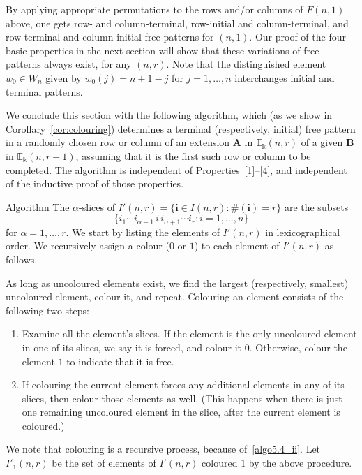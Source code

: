 \documentclass[ALCO,ThmDefs,Unicode,epreuves]{cedram}
\newcommand{\E}{\mathbb{E}}
\newcommand{\bi}{{\boldsymbol{i}}} %
\newcommand{\bA}{\mathbf{A}}
\newcommand{\bB}{\mathbf{B}}
\newenvironment{algorithm}{\begin{enonce}{Algorithm}}{\end{enonce}} %
\begin{document}
By applying appropriate permutations to the rows and/or columns of
$F(n,1)$ above, one gets row- and column-terminal, row-initial and
column-terminal, and row-terminal and column-initial free patterns for
$(n,1)$. Our proof of the four basic properties in the next section
will show that these variations of free patterns always exist, for any
$(n,r)$. Note that the distinguished element $w_0 \in W_n$ given by
$w_0(j) = n+1-j$ for $j = 1, \dots, n$ interchanges initial and
terminal patterns.


We conclude this section with the following algorithm, which (as we
show in Corollary~\ref{cor:colouring}) determines a terminal
(respectively, initial) free pattern in a randomly chosen row or
column of an extension $\bA$ in $\E_\Bbbk(n,r)$ of a given $\bB$ in
$\E_\Bbbk(n,r-1)$, assuming that it is the first such row or column to
be completed. The algorithm is independent of
Properties~\ref{1}--\ref{4}, and independent of the inductive proof of
those properties.

\begin{algorithm}\label{algo}
The $\alpha$-slices of $I'(n,r)=\{\bi \in I(n,r): \#(\bi)=r\}$ are the
subsets
\[
\{i_1 \cdots i_{\alpha-1}\, i\, i_{\alpha+1}\cdots i_r: i = 1, \dots,
n\}
\]
for $\alpha = 1, \dots, r$. We start by listing the elements of
$I'(n,r)$ in lexicographical order. We recursively assign a colour
\textup{(}$0$ or $1$\textup{)} to each element of $I'(n,r)$ as follows.

As long as uncoloured elements exist, we find the largest
\textup{(}respectively, smallest\textup{)} uncoloured element, colour
it, and repeat. Colouring an element consists of the following two
steps:
\begin{enumerate}[label=(\alph*)]
\item\label{algo5.4_i} Examine all the element's slices. If the element is the only
 uncoloured element in one of its slices, we say it is forced, and
 colour it $0$. Otherwise, colour the element $1$ to indicate that it
 is free.
\item\label{algo5.4_ii} If colouring the current element forces any additional elements
 in any of its slices, then colour those elements as
 well. \textup{(}This happens when there is just one remaining
 uncoloured element in the slice, after the current element is
 coloured.\textup{)}
\end{enumerate}
We note that colouring is a recursive process, because of~\ref{algo5.4_ii}. Let $I'_1(n,r)$ be the set of elements of $I'(n,r)$
coloured $1$ by the above procedure.
\end{algorithm}
\end{document}
